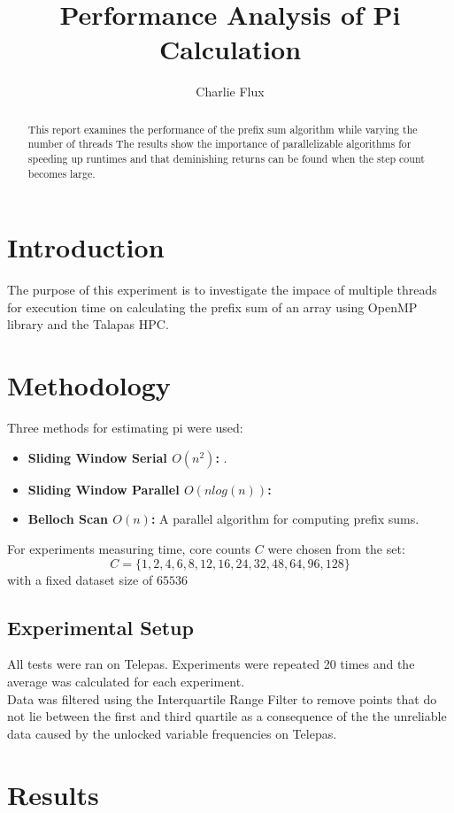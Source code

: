 \documentclass[conference]{IEEEtran}
\title{Performance Analysis of Pi Calculation}
\author{Charlie Flux}
\begin{document}
\maketitle

\begin{abstract}
This report examines the performance of the prefix sum algorithm while varying the number of threads
The results show the importance of parallelizable algorithms for speeding up runtimes and that deminishing returns can be found when the step count becomes large.
\end{abstract}

\section{Introduction}
The purpose of this experiment is to investigate the impace of multiple threads for execution time on calculating the prefix sum of an array using OpenMP library and the Talapas HPC. 
\section{Methodology}
Three methods for estimating pi were used:
\begin{itemize}
    \item \textbf{Sliding Window Serial $O(n^2)$:} .
    \item \textbf{Sliding Window Parallel $O(nlog(n))$:} 
    \item \textbf{Belloch Scan $O(n)$:} A parallel algorithm for computing prefix sums.
\end{itemize}

For experiments measuring time, core counts \(C\) were chosen from the set:
    \[
    C = \{1, 2, 4, 6, 8, 12, 16, 24, 32, 48, 64, 96, 128\}
    \]
with a fixed dataset size of $65536$

\subsection{Experimental Setup}
All tests were ran on Telepas. Experiments were repeated 20 times and the average was calculated for each experiment. \\
Data was filtered using the Interquartile Range Filter to remove points that do not lie between the first and third quartile as a consequence of the the unreliable data caused by the unlocked variable frequencies on Telepas.

\section{Results}
\end{document}

